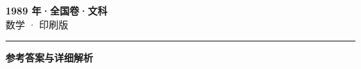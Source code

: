 \documentclass[zihao=5, a4paper]{ctexart}
\begin{document}
\begin{center}
  {\Large\bfseries 1989 年·全国卷·文科}\\[4pt]
  {\large 数学 · 印刷版}
\end{center}
\medskip
{}

\par\bigskip\hrule\bigskip
{}
\begin{center}{\large\bfseries 参考答案与详细解析}\end{center}
\smallskip

\end{document}

